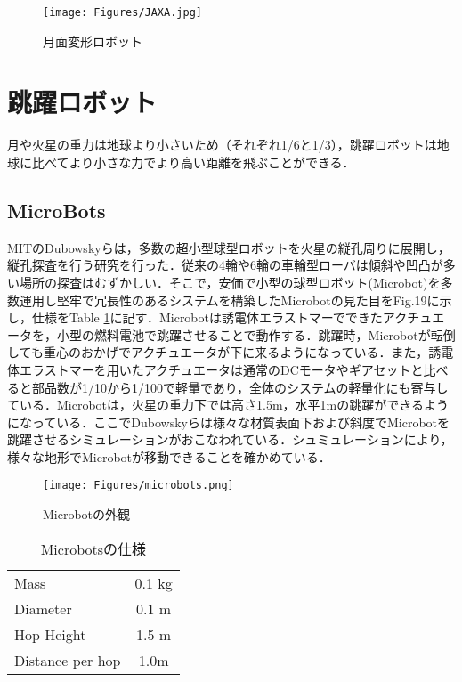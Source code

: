 \documentclass[a4paper,11pt,dvipdfmx.uplatex]{jsarticle}
\begin{document}
\begin{figure} [htbp]
	\texttt{[image: Figures/JAXA.jpg]}
	\caption{月面変形ロボット\cite{JAXA}}
	\label{JAXA}
\end{figure}

\section{跳躍ロボット}
月や火星の重力は地球より小さいため（それぞれ1/6と1/3），跳躍ロボットは地球に比べてより小さな力でより高い距離を飛ぶことができる．

\subsection{\bf MicroBots}
MITのDubowskyらは，多数の超小型球型ロボットを火星の縦孔周りに展開し，縦孔探査を行う研究を行った．\cite{microbots}従来の4輪や6輪の車輪型ローバは傾斜や凹凸が多い場所の探査はむずかしい．そこで，安価で小型の球型ロボット(Microbot)を多数運用し堅牢で冗長性のあるシステムを構築したMicrobotの見た目をFig.19に示し，仕様をTable \ref{microbots}に記す．Microbotは誘電体エラストマーでできたアクチュエータを，小型の燃料電池で跳躍させることで動作する．跳躍時，Microbotが転倒しても重心のおかげでアクチュエータが下に来るようになっている．また，誘電体エラストマーを用いたアクチュエータは通常のDCモータやギアセットと比べると部品数が1/10から1/100で軽量であり，全体のシステムの軽量化にも寄与している．Microbotは，火星の重力下では高さ1.5m，水平1mの跳躍ができるようになっている．ここでDubowskyらは様々な材質表面下および斜度でMicrobotを跳躍させるシミュレーションがおこなわれている．シュミュレーションにより，様々な地形でMicrobotが移動できることを確かめている．

\begin{figure} [htbp]
    \centering
	\texttt{[image: Figures/microbots.png]}
	\caption{Microbotの外観\cite{microbots}}
	\label{microbot}
\end{figure}

\vspace{20pt}

\begin{table}[htpb]
\centering
\caption{Microbotsの仕様\cite{microbots}}
\label{microbots}
\begin{tabular}{lc}
\hline
Mass             & 0.1 kg \\
Diameter         & 0.1 m  \\
Hop Height        & 1.5 m  \\
Distance per hop & 1.0m   \\ \hline
\end{tabular}
\end{table}
\end{document}
